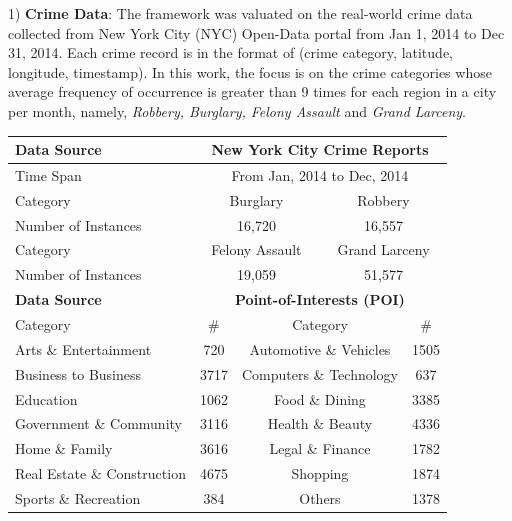 1) \textbf{Crime Data}: The framework was valuated on the
real-world crime data collected from New York City (NYC) Open-Data portal from Jan 1, 2014 to Dec 31, 2014. Each crime record
is in the format of (crime category, latitude, longitude, timestamp).
In this work, the focus is on the crime categories whose average frequency of occurrence is greater than 9 times for each region in
a city per month, namely, \textit{Robbery, Burglary, Felony Assault} and
\textit{Grand Larceny}.
\begin{table}
\centering
\begin{tabular}{l|c|c|c|c|c|c|}
\toprule
\textbf{Data Source} &\multicolumn{6}{|c}{\textbf{New York City Crime Reports}}\\[0.1cm]
\hline
\hline
Time Span &\multicolumn{6}{|c}{From Jan, 2014 to Dec, 2014}  \\[0.1cm]
\hline
Category &\multicolumn{3}{|c|}{Burglary}  &\multicolumn{3}{|c}{Robbery}\\[0.1cm]
\hline
Number of Instances &\multicolumn{3}{|c|}{16,720} &\multicolumn{3}{|c}{16,557}\\[0.1cm]
\hline
Category &\multicolumn{3}{|c|}{Felony Assault}  &\multicolumn{3}{|c}{Grand Larceny}\\[0.1cm]
\hline  
Number of Instances &\multicolumn{3}{|c|}{19,059} &\multicolumn{3}{|c}{51,577}\\[0.1cm]


\toprule
\textbf{Data Source} &\multicolumn{6}{|c}{\textbf{Point-of-Interests (POI)}}\\[0.1cm]
\hline
\hline
Category &\multicolumn{2}{|c|}{\#} & \multicolumn{2}{|c|}{Category} &\multicolumn{2}{|c}{\#}    \\[0.1cm]
\hline
Arts \& Entertainment &\multicolumn{2}{|c|}{720} & \multicolumn{2}{|c|}{Automotive \& Vehicles} &\multicolumn{2}{|c}{1505}    \\[0.1cm]
\hline
Business to Business &\multicolumn{2}{|c|}{3717} & \multicolumn{2}{|c|}{Computers \& Technology} &\multicolumn{2}{|c}{637}    \\[0.1cm]
\hline
Education &\multicolumn{2}{|c|}{1062} & \multicolumn{2}{|c|}{Food \& Dining} &\multicolumn{2}{|c}{3385}    \\[0.1cm]
\hline
Government \& Community &\multicolumn{2}{|c|}{3116} & \multicolumn{2}{|c|}{Health \& Beauty} &\multicolumn{2}{|c}{4336}    \\[0.1cm]
\hline
Home \& Family &\multicolumn{2}{|c|}{3616} & \multicolumn{2}{|c|}{Legal \& Finance} &\multicolumn{2}{|c}{1782}    \\[0.1cm]
\hline
Real Estate \& Construction &\multicolumn{2}{|c|}{4675} & \multicolumn{2}{|c|}{Shopping} &\multicolumn{2}{|c}{1874}    \\[0.1cm]
\hline
Sports \& Recreation &\multicolumn{2}{|c|}{384} & \multicolumn{2}{|c|}{Others} &\multicolumn{2}{|c}{1378}    \\[0.1cm]
\hline



\end{tabular}
\end{table}
